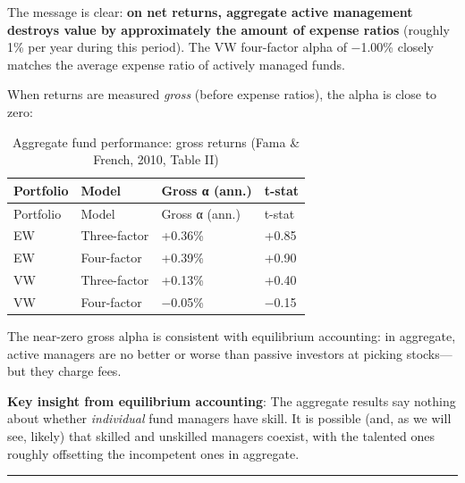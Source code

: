 \documentclass[
  letterpaper,
  DIV=11,
  numbers=noendperiod]{scrartcl}
\begin{document}
The message is clear: \textbf{on net returns, aggregate active
management destroys value by approximately the amount of expense ratios}
(roughly 1\% per year during this period). The VW four-factor alpha of
−1.00\% closely matches the average expense ratio of actively managed
funds.

When returns are measured \emph{gross} (before expense ratios), the
alpha is close to zero:

\begin{longtable}[]{@{}llll@{}}
\caption{Aggregate fund performance: gross returns (Fama \& French,
2010, Table II)}\tabularnewline
\toprule\noalign{}
Portfolio & Model & Gross α (ann.) & t-stat \\
\midrule\noalign{}
\endfirsthead
\toprule\noalign{}
Portfolio & Model & Gross α (ann.) & t-stat \\
\midrule\noalign{}
\endhead
\bottomrule\noalign{}
\endlastfoot
EW & Three-factor & +0.36\% & +0.85 \\
EW & Four-factor & +0.39\% & +0.90 \\
VW & Three-factor & +0.13\% & +0.40 \\
VW & Four-factor & −0.05\% & −0.15 \\
\end{longtable}

The near-zero gross alpha is consistent with equilibrium accounting: in
aggregate, active managers are no better or worse than passive investors
at picking stocks---but they charge fees.

\begin{tcolorbox}[enhanced jigsaw, arc=.35mm, bottomrule=.15mm, bottomtitle=1mm, breakable, colback=white, colbacktitle=quarto-callout-note-color!10!white, colframe=quarto-callout-note-color-frame, coltitle=black, left=2mm, leftrule=.75mm, opacityback=0, opacitybacktitle=0.6, rightrule=.15mm, title=\textcolor{quarto-callout-note-color}{\faInfo}\hspace{0.5em}{Note}, titlerule=0mm, toprule=.15mm, toptitle=1mm]

\textbf{Key insight from equilibrium accounting}: The aggregate results
say nothing about whether \emph{individual} fund managers have skill. It
is possible (and, as we will see, likely) that skilled and unskilled
managers coexist, with the talented ones roughly offsetting the
incompetent ones in aggregate.

\end{tcolorbox}

\begin{center}\rule{0.5\linewidth}{0.5pt}\end{center}
\end{document}
